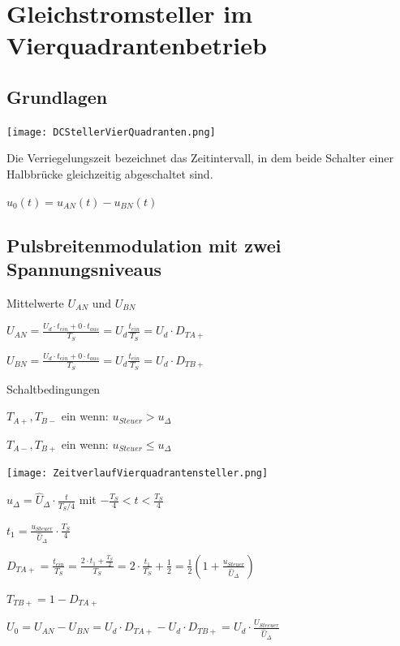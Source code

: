 \documentclass[german]{latex4ei/latex4ei_sheet}
\begin{document}
\section{Gleichstromsteller im Vierquadrantenbetrieb}
	\begin{sectionbox}
		\subsection{Grundlagen}
			\texttt{[image: DCStellerVierQuadranten.png]}
			\begin{bluebox}
				\item Die Verriegelungszeit bezeichnet das Zeitintervall, in dem beide Schalter einer Halbbrücke gleichzeitig abgeschaltet sind.
				\item $u_0(t) = u_{AN}(t)-u_{BN}(t)$
			\end{bluebox}
		\subsection{Pulsbreitenmodulation mit zwei Spannungsniveaus}
			\begin{bluebox}{Mittelwerte $U_{AN}$ und $U_{BN}$}
				\item $ U_{AN} = \frac{U_d \cdot t_{ein}+0\cdot t_{aus}}{T_S} = U_d \frac{t_{ein}}{T_S} = U_d \cdot D_{TA+}$
				\item $ U_{BN} = \frac{U_d \cdot t_{ein}+0\cdot t_{aus}}{T_S} = U_d \frac{t_{ein}}{T_S} = U_d \cdot D_{TB+}$
			\end{bluebox}
			\begin{bluebox}{Schaltbedingungen}
				\item $T_{A+}, T_{B-}$ ein wenn: $u_{Steuer} > u_\Delta$
				\item $T_{A-}, T_{B+}$ ein wenn: $u_{Steuer} \leq u_\Delta$
				\item \texttt{[image: ZeitverlaufVierquadrantensteller.png]}
				\item $u_\Delta = \hat{U}_\Delta \cdot \frac{t}{T_S/4}$ mit $-\frac{T_S}{4} < t < \frac{T_S}{4}$
				\item $t_1 = \frac{u_{Steuer}}{\hat{U}_\Delta}\cdot \frac{T_S}{4}$
				\item $D_{TA+} = \frac{t_{ein}}{T_S} = \frac{2\cdot t_1 +\frac{T_S}{2}}{T_S} = 2\cdot\frac{t_1}{T_S}+\frac{1}{2} = \frac{1}{2}\left(1+\frac{u_{Steuer}}{\hat{U}_\Delta}\right)$
				\item $T_{TB+} = 1-D_{TA+}$
				\item $U_0 = U_{AN}-U_{BN} = U_d \cdot D_{TA+}-U_d\cdot D_{TB+} = U_d\cdot \frac{U_{Steeuer}}{\hat{U}_\Delta}$
			\end{bluebox}
	\end{sectionbox}
\end{document}
